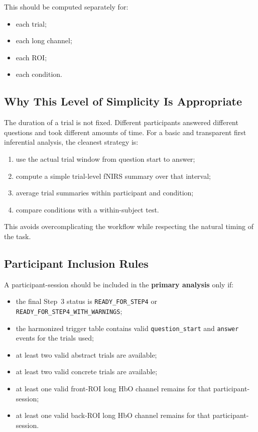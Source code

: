 This should be computed separately for:
\begin{itemize}
    \item each trial;
    \item each long channel;
    \item each ROI;
    \item each condition.
\end{itemize}

\subsection{Why This Level of Simplicity Is Appropriate}
The duration of a trial is not fixed.
Different participants answered different questions and took different amounts of time.
For a basic and transparent first inferential analysis, the cleanest strategy is:
\begin{enumerate}
    \item use the actual trial window from question start to answer;
    \item compute a simple trial-level fNIRS summary over that interval;
    \item average trial summaries within participant and condition;
    \item compare conditions with a within-subject test.
\end{enumerate}

This avoids overcomplicating the workflow while respecting the natural timing of the task.

\subsection{Participant Inclusion Rules}
A participant-session should be included in the \textbf{primary analysis} only if:
\begin{itemize}
    \item the final Step~3 status is \texttt{READY\_FOR\_STEP4} or
    \texttt{READY\_FOR\_STEP4\_WITH\_WARNINGS};
    \item the harmonized trigger table contains valid \texttt{question\_start} and \texttt{answer}
    events for the trials used;
    \item at least two valid abstract trials are available;
    \item at least two valid concrete trials are available;
    \item at least one valid front-ROI long HbO channel remains for that participant-session;
    \item at least one valid back-ROI long HbO channel remains for that participant-session.
\end{itemize}

